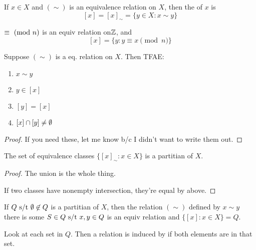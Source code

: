 \documentclass[12pt]{article}
\newcommand{\class}[1]{\left[#1\right]}
\begin{document}
\bboxdefn
\begin{defn}
    If \(x\in X\) and \((\sim)\) is an equivalence relation
    on \(X\), then the  of \(x\) is
    \[
        [x]=\class{x}_\sim=\{
            y \in X : x \sim y
        \}
    \]
\end{defn}
\ebox



\bboxexam
\begin{exam}
    \(\equiv\ (\mathrm{mod}\ n)\) is an equiv relation on\(\mathbb Z\),
    and 
    \[
        \class{x} = \{
            y : y \equiv x\pmod{n}
        \}
    \]
\end{exam}
\ebox

\bboxprop
\begin{prop}
    Suppose \((\sim)\) is a eq. relation on \(X\). Then TFAE:
    \begin{enumerate}
        \item \(x\sim y\)
        \item \(y\in\class{x}\)
        \item \(\class{y}=\class{x}\)
        \item \(\class{x}\intr\class{y}\neq\emptyset\)
    \end{enumerate}
\end{prop}
\ebox

\bboxproof
\begin{proof}
    If you need these, let me know b/c I didn't want to write them out.
\end{proof}
\ebox

\bboxcoro
\begin{coro}
    The set of equivalence classes 
    \(\{\class{x}_\sim : x\in X\}\) is a 
    partitian of \(X\).
\end{coro}
\ebox

\bboxproof
\begin{proof}
    The union is the whole thing.

    If two classes have nonempty intersection, they're equal by above.
\end{proof}
\ebox

\bboxlem
\begin{lem}
    If \(Q\text{ s/t }\emptyset\not\in Q\) is a partitian of \(X\), then
    the relation \((\sim)\) defined by \(x\sim y\) 
    there is some \(S\in Q\text{ s/t } x,y\in Q\) is an equiv relation and
    \(\{\class{x}:x\in X\}=Q\).

    Look at each set in \(Q\). Then a relation is induced by
    if both elements are in that set.
\end{lem}
\ebox
\end{document}
